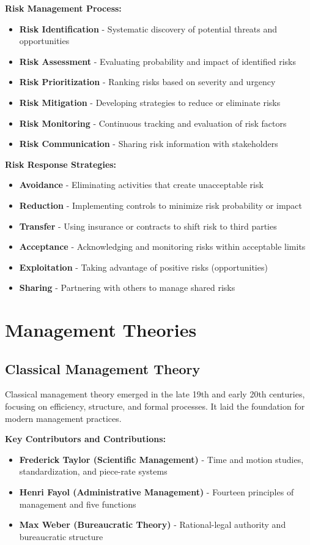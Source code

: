 \documentclass[12pt]{article}
\begin{document}
\textbf{Risk Management Process:}
\begin{itemize}
    \item \textbf{Risk Identification} - Systematic discovery of potential threats and opportunities
    \item \textbf{Risk Assessment} - Evaluating probability and impact of identified risks
    \item \textbf{Risk Prioritization} - Ranking risks based on severity and urgency
    \item \textbf{Risk Mitigation} - Developing strategies to reduce or eliminate risks
    \item \textbf{Risk Monitoring} - Continuous tracking and evaluation of risk factors
    \item \textbf{Risk Communication} - Sharing risk information with stakeholders
\end{itemize}

\textbf{Risk Response Strategies:}
\begin{itemize}
    \item \textbf{Avoidance} - Eliminating activities that create unacceptable risk
    \item \textbf{Reduction} - Implementing controls to minimize risk probability or impact
    \item \textbf{Transfer} - Using insurance or contracts to shift risk to third parties
    \item \textbf{Acceptance} - Acknowledging and monitoring risks within acceptable limits
    \item \textbf{Exploitation} - Taking advantage of positive risks (opportunities)
    \item \textbf{Sharing} - Partnering with others to manage shared risks
\end{itemize}

\section{Management Theories}

\subsection{Classical Management Theory}
Classical management theory emerged in the late 19th and early 20th centuries, focusing on efficiency, structure, and formal processes. It laid the foundation for modern management practices.

\textbf{Key Contributors and Contributions:}
\begin{itemize}
    \item \textbf{Frederick Taylor (Scientific Management)} - Time and motion studies, standardization, and piece-rate systems
    \item \textbf{Henri Fayol (Administrative Management)} - Fourteen principles of management and five functions
    \item \textbf{Max Weber (Bureaucratic Theory)} - Rational-legal authority and bureaucratic structure
\end{itemize}
\end{document}
